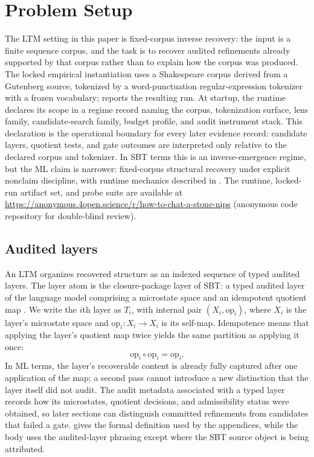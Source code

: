 \documentclass{article}
\newcommand{\Tlayer}[1]{T_{#1}}                    \newcommand{\Xspace}[1]{X_{#1}}                    \newcommand{\opmap}[1]{\mathrm{op}_{#1}}           \newcommand{\CDtau}{\mathrm{CD}_{\tau}}            \newcommand{\IDef}{\delta_{\tau,f}}                \newcommand{\strictcert}{\mathsf{StrictExtCert}}   \newcommand{\Kquot}{K}                             \newcommand{\Rquot}{R}
\theoremstyle{definition}
\begin{document}
 \section{Problem Setup}\label{sec:problem-setup}

The LTM setting in this paper is fixed-corpus inverse recovery: the input is a finite sequence corpus, and the task is to recover audited refinements already supported by that corpus rather than to explain how the corpus was produced. The locked empirical instantiation uses a Shakespeare corpus derived from a Gutenberg source, tokenized by a word-punctuation regular-expression tokenizer with a frozen vocabulary;  reports the resulting run. At startup, the runtime declares its scope in a regime record naming the corpus, tokenization surface, lens family, candidate-search family, budget profile, and audit instrument stack. This declaration is the operational boundary for every later evidence record: candidate layers, quotient tests, and gate outcomes are interpreted only relative to the declared corpus and tokenizer. In SBT terms this is an inverse-emergence regime, but the ML claim is narrower: fixed-corpus structural recovery under explicit nonclaim discipline, with runtime mechanics described in  \cite{Tsiokos2026FoundationsII}. The runtime, locked-run artifact set, and probe suite are available at \url{https://anonymous.4open.science/r/how-to-chat-a-stone-nips} (anonymous code repository for double-blind review).

\subsection{Audited layers}\label{subsec:audited-layers}

An LTM organizes recovered structure as an indexed sequence of typed audited layers. The layer atom is the closure-package layer of SBT: a typed audited layer of the language model comprising a microstate space and an idempotent quotient map \cite{Tsiokos2026FoundationsI}. We write the $i$th layer as $\Tlayer{i}$, with internal pair $(\Xspace{i},\opmap{i})$, where $\Xspace{i}$ is the layer's microstate space and $\opmap{i}:\Xspace{i}\to\Xspace{i}$ is its self-map. Idempotence means that applying the layer's quotient map twice yields the same partition as applying it once:
\[
\opmap{i}\circ\opmap{i}=\opmap{i}.
\]
In ML terms, the layer's recoverable content is already fully captured after one application of the map; a second pass cannot introduce a new distinction that the layer itself did not audit. The audit metadata associated with a typed layer records how its microstates, quotient decisions, and admissibility status were obtained, so later sections can distinguish committed refinements from candidates that failed a gate.  gives the formal definition used by the appendices, while the body uses the audited-layer phrasing except where the SBT source object is being attributed.
\end{document}
